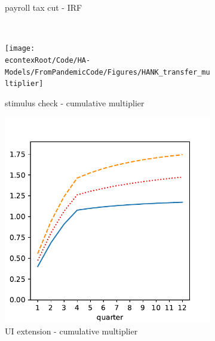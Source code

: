 \documentclass[\econtexRoot/HAFiscal]{subfiles}
\begin{document}
\begin{figure}[htb]
\begin{subfigure}[b]{.33\linewidth}
		\caption{payroll tax cut - IRF}
		\notinsubfile{\label{fig:hank_tax_irf}}
	\end{subfigure}\\
	\begin{subfigure}[b]{.33\linewidth}
		\centering
		\texttt{[image: \\econtexRoot/Code/HA-Models/FromPandemicCode/Figures/HANK\_transfer\_multiplier]}
		\caption{stimulus check - cumulative multiplier}
		\notinsubfile{\label{fig:HANK_transfer_multiplier}}
	\end{subfigure}%
	\begin{subfigure}[b]{.33\linewidth}
		\centering
		\includegraphics[width=\linewidth]{Code/HA-Models/FromPandemicCode/Figures/HANK_UI_multiplier}
		\caption{UI extension - cumulative multiplier}
		\notinsubfile{\label{fig:HANK_UI_multiplier}}
	\end{subfigure}%
	\begin{subfigure}[b]{.33\linewidth}
		\centering

\end{subfigure}
\end{figure}
\end{document}
